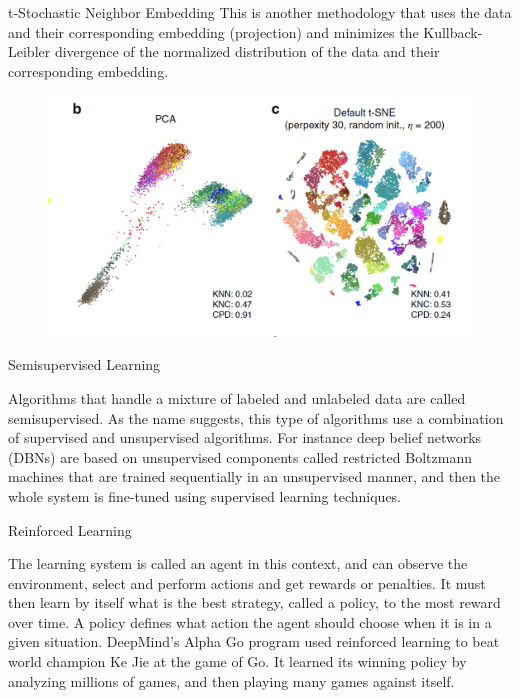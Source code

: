 \documentclass{beamer}
\begin{document}
\begin{frame}{t-Stochastic Neighbor Embedding}
	This is another methodology that uses the data and their corresponding embedding (projection) and minimizes the Kullback-Leibler divergence of the normalized distribution of the data and their corresponding embedding. 
		\begin{figure}[h]
	\centering
	\includegraphics[scale=0.4]{Figures/pca_vs_tsne.png}
\end{figure}	
	
\end{frame}

\begin{frame}{Semisupervised Learning}	

	Algorithms that handle a mixture of labeled and unlabeled data are called semisupervised. As the name suggests, this type of algorithms use a combination of supervised and unsupervised algorithms. For instance deep belief networks (DBNs) are based on unsupervised components called restricted Boltzmann machines that are trained sequentially in an unsupervised manner, and then the whole system is fine-tuned using supervised learning techniques.

\end{frame}

\begin{frame}{Reinforced Learning}	
	
	The learning system is called an agent in this context, and can observe the environment, select and perform actions and get rewards or penalties. It must then learn by itself what is the best strategy, called a policy, to the most reward over time. A policy defines what action the agent should choose when it is in a given situation. DeepMind's Alpha Go program used reinforced learning to beat world champion Ke Jie at the game of Go. It learned its winning policy by analyzing millions of games, and then playing many games against itself.
\end{frame}
\end{document}
